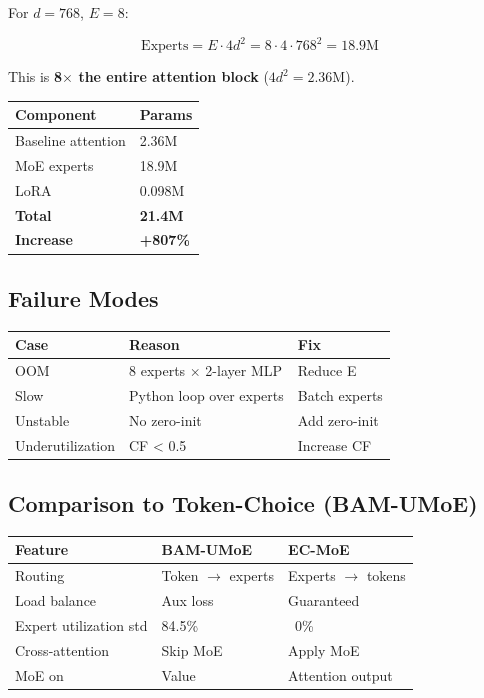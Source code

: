For $d = 768$, $E = 8$:

\[
\text{Experts} = E \cdot 4 d^2 = 8 \cdot 4 \cdot 768^2 = 18.9\text{M}
\tag{8.2}
\]

This is \textbf{8$\times$ the entire attention block} ($4 d^2 = 2.36$M).

\begin{table}[H]
\centering
\small
\begin{tabular}{ll}
\toprule
\textbf{Component} & \textbf{Params} \\
\midrule
Baseline attention & 2.36M \\
MoE experts & 18.9M \\
LoRA & 0.098M \\
\textbf{Total} & \textbf{21.4M} \\
\textbf{Increase} & \textbf{+807\%} \\
\bottomrule
\end{tabular}
\end{table}

\subsection{Failure Modes}

\begin{table}[H]
\centering
\small
\begin{tabular}{lll}
\toprule
\textbf{Case} & \textbf{Reason} & \textbf{Fix} \\
\midrule
OOM & 8 experts $\times$ 2-layer MLP & Reduce E \\
Slow & Python loop over experts & Batch experts \\
Unstable & No zero-init & Add zero-init \\
Underutilization & CF \textless{} 0.5 & Increase CF \\
\bottomrule
\end{tabular}
\end{table}

\subsection{Comparison to Token-Choice (BAM-UMoE)}

\begin{table}[H]
\centering
\small
\begin{tabular}{lll}
\toprule
\textbf{Feature} & \textbf{BAM-UMoE} & \textbf{EC-MoE} \\
\midrule
Routing & Token $\to$ experts & Experts $\to$ tokens \\
Load balance & Aux loss & Guaranteed \\
Expert utilization std & 84.5\% & ~0\% \\
Cross-attention & Skip MoE & Apply MoE \\
MoE on & Value & Attention output \\
\bottomrule
\end{tabular}
\end{table}


